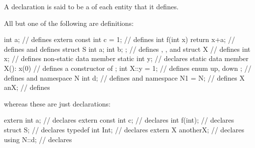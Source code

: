 A declaration is said to be a  of each entity that it defines.
\begin{example} All but one of the following are definitions:
%
\begin{codeblock}
int a;                          // defines 
extern const int c = 1;         // defines 
int f(int x) { return x+a; }    // defines  and defines 
struct S { int a; int b; };     // defines , , and 
struct X {                      // defines 
  int x;                        // defines non-static data member 
  static int y;                 // declares static data member 
  X(): x(0) { }                 // defines a constructor of 
};
int X::y = 1;                   // defines 
enum { up, down };              // defines  and 
namespace N { int d; }          // defines  and 
namespace N1 = N;               // defines 
X anX;                          // defines 

\end{codeblock}
whereas these are just declarations:
%
\begin{codeblock}
extern int a;                   // declares 
extern const int c;             // declares 
int f(int);                     // declares 
struct S;                       // declares 
typedef int Int;                // declares 
extern X anotherX;              // declares 
using N::d;                     // declares 
\end{codeblock}
\end{example}

